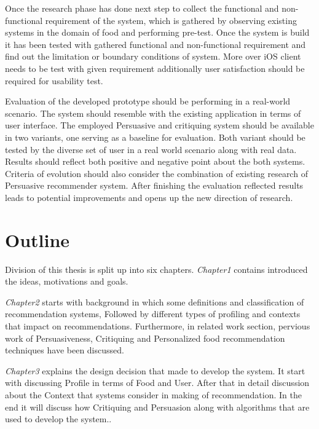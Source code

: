 Once the research phase has done next step to collect the functional and non-functional requirement of the system, which is gathered by observing existing systems in the domain of food and performing pre-test. Once the system is build it has been tested with gathered functional and non-functional requirement and find out the limitation or boundary conditions of system. More over iOS client needs to be test with given requirement additionally user satisfaction should be required for usability test.\newline

Evaluation of the developed prototype should be performing in a real-world scenario. The system should resemble with the existing application in terms of user interface. The employed Persuasive and critiquing system should be available in two variants, one serving as a baseline for evaluation. Both variant should be tested by the diverse set of user in a real world scenario along with real data. Results should reflect both positive and negative point about the both systems. Criteria of evolution should also consider the combination of existing research of Persuasive recommender system. After finishing the evaluation reflected results leads to potential improvements and opens up the new direction of research.\newline

\section{Outline}

Division of this thesis is split up into six chapters. \textit{Chapter1} contains introduced the ideas, motivations and goals.\newline

\textit{Chapter2} starts with background in which some definitions and classification of recommendation systems, Followed by different types of profiling and contexts that impact on recommendations. Furthermore, in related work section, pervious work of Persuasiveness, Critiquing and Personalized food recommendation techniques have been discussed.\newline

\textit{Chapter3} explains the design decision that made to develop the system. It start with discussing Profile in terms of Food and User. After that in detail discussion about the Context that systems consider in making of recommendation. In the end it will discuss how Critiquing and Persuasion along with algorithms that are used to develop the system..\newline

